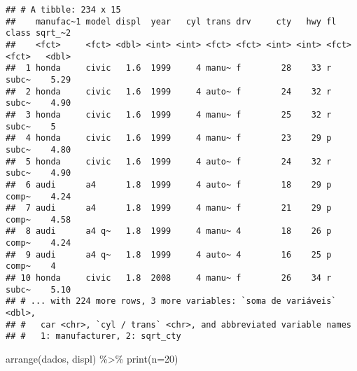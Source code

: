 \documentclass[
]{book}
\newenvironment{Shaded}{\begin{snugshade}}{\end{snugshade}}
\newcommand{\AttributeTok}[1]{\textcolor[rgb]{0.77,0.63,0.00}{#1}}
\newcommand{\DecValTok}[1]{\textcolor[rgb]{0.00,0.00,0.81}{#1}}
\newcommand{\FunctionTok}[1]{\textcolor[rgb]{0.00,0.00,0.00}{#1}}
\newcommand{\NormalTok}[1]{#1}
\newcommand{\SpecialCharTok}[1]{\textcolor[rgb]{0.00,0.00,0.00}{#1}}
\begin{document}
\begin{verbatim}
## # A tibble: 234 x 15
##    manufac~1 model displ  year   cyl trans drv     cty   hwy fl    class sqrt_~2
##    <fct>     <fct> <dbl> <int> <int> <fct> <fct> <int> <int> <fct> <fct>   <dbl>
##  1 honda     civic   1.6  1999     4 manu~ f        28    33 r     subc~    5.29
##  2 honda     civic   1.6  1999     4 auto~ f        24    32 r     subc~    4.90
##  3 honda     civic   1.6  1999     4 manu~ f        25    32 r     subc~    5   
##  4 honda     civic   1.6  1999     4 manu~ f        23    29 p     subc~    4.80
##  5 honda     civic   1.6  1999     4 auto~ f        24    32 r     subc~    4.90
##  6 audi      a4      1.8  1999     4 auto~ f        18    29 p     comp~    4.24
##  7 audi      a4      1.8  1999     4 manu~ f        21    29 p     comp~    4.58
##  8 audi      a4 q~   1.8  1999     4 manu~ 4        18    26 p     comp~    4.24
##  9 audi      a4 q~   1.8  1999     4 auto~ 4        16    25 p     comp~    4   
## 10 honda     civic   1.8  2008     4 manu~ f        26    34 r     subc~    5.10
## # ... with 224 more rows, 3 more variables: `soma de variáveis` <dbl>,
## #   car <chr>, `cyl / trans` <chr>, and abbreviated variable names
## #   1: manufacturer, 2: sqrt_cty
\end{verbatim}

\begin{Shaded}
\begin{Highlighting}[]
\FunctionTok{arrange}\NormalTok{(dados, displ) }\SpecialCharTok{\%\textgreater{}\%} 
  \FunctionTok{print}\NormalTok{(}\AttributeTok{n=}\DecValTok{20}\NormalTok{)}
\end{Highlighting}
\end{Shaded}
\end{document}
